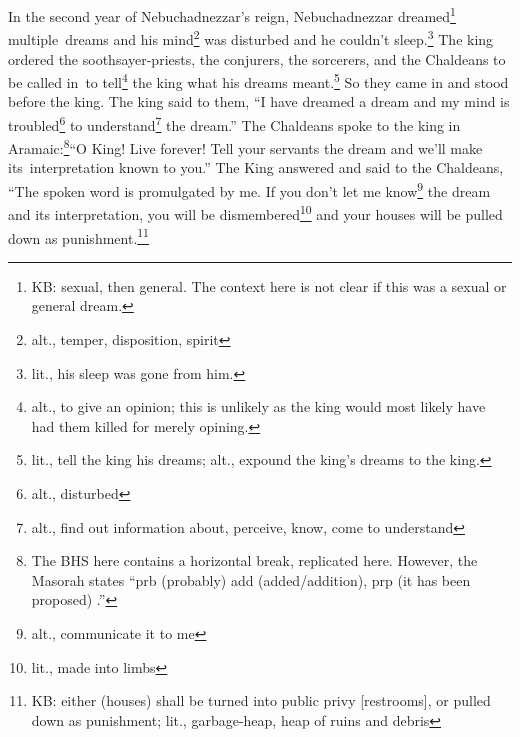 
\begin{inparaenum}
     In the second year of Nebuchadnezzar's reign, Nebuchadnezzar dreamed\footnote{KB: sexual, then general. The context here is not clear if this was a sexual or general dream.} multiple\understood\ dreams and his mind\footnote{alt., temper, disposition, spirit} was disturbed and he couldn't sleep.\footnote{lit., his sleep was gone from him.}%
     The king ordered the soothsayer-priests, the conjurers, the sorcerers, and the Chaldeans to be called in\understood\ to tell\footnote{alt., to give an opinion; this is unlikely as the king would most likely have had them killed for merely opining.} the king what his dreams meant.\footnote{lit., tell the king his dreams; alt., expound the king's dreams to the king.} So they came in and stood before the king.%
     The king said to them, ``I have dreamed a dream and my mind is troubled\footnote{alt., disturbed} to understand\footnote{alt., find out information about, perceive, know, come to understand} the dream.''%
     The Chaldeans spoke to the king in Aramaic:\footnote{The BHS here contains a horizontal break, replicated here. However, the Masorah states ``prb (probably) add (added/addition), prp (it has been proposed) .''}\hspace*{4em}``O King! Live forever! Tell your servants the dream and we'll make its\understood\ interpretation known to you.''%
     The King answered and said to the Chaldeans, ``The spoken word is promulgated by me. If you don't let me know\footnote{alt., communicate it to me} the dream and its interpretation, you will be dismembered\footnote{lit., made into limbs} and your houses will be pulled down as punishment.\footnote{KB: either (houses) shall be turned into public privy [restrooms], or pulled down as punishment; lit., garbage-heap, heap of ruins and debris}%
    
    
    

\end{inparaenum}

